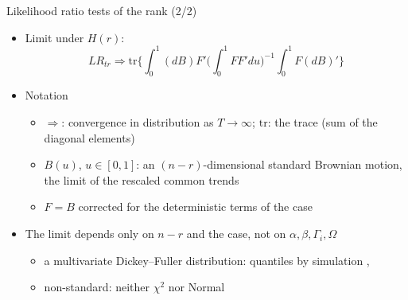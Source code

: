 \begin{frame}{Likelihood ratio tests of the rank (2/2)}
\itemsize{\small}
\begin{itemize}
    \item Limit under $H(r)$: \[ LR_{tr} \Rightarrow \mathrm{tr}\Big\{\int_0^1 (dB)F'\Big(\int_0^1 FF'du\Big)^{-1}\int_0^1 F(dB)'\Big\} \]
    \item Notation
    \begin{itemize}
        \item $\Rightarrow$: convergence in distribution as $T \to \infty$; $\mathrm{tr}$: the trace (sum of the diagonal elements)
        \item $B(u)$, $u \in [0, 1]$: an $(n - r)$-dimensional standard Brownian motion, the limit of the rescaled common trends
        \item $F = B$ corrected for the deterministic terms of the case
    \end{itemize}
    \item The limit depends only on $n - r$ and the case, not on $\alpha, \beta, \Gamma_i, \Omega$
    \begin{itemize}
        \item a multivariate Dickey--Fuller distribution: quantiles by simulation , 
        \item non-standard: neither $\chi^2$ nor Normal
    \end{itemize}
\end{itemize}
\end{frame}


